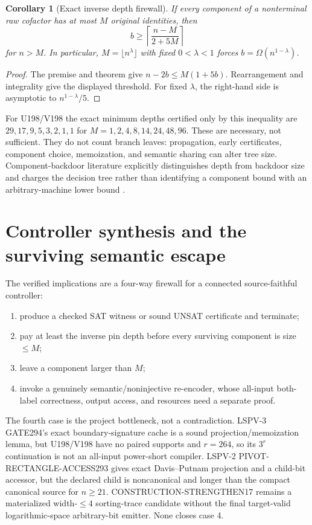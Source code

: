 \documentclass[11pt]{article}
\newtheorem{corollary}{Corollary}
\begin{document}
\begin{corollary}[Exact inverse depth firewall]
If every component of a nonterminal raw cofactor has at most $M$ original identities, then
\[
 b\ge \left\lceil\frac{n-M}{2+5M}\right\rceil
\]
for $n>M$.  In particular, $M=\lfloor n^\lambda\rfloor$ with fixed $0<\lambda<1$ forces $b=\Omega(n^{1-\lambda})$.
\end{corollary}
\begin{proof}
The premise and theorem give $n-2b\le M(1+5b)$.  Rearrangement and integrality give the displayed threshold.  For fixed $\lambda$, the right-hand side is asymptotic to $n^{1-\lambda}/5$.
\end{proof}

For U198/V198 the exact minimum depths certified only by this inequality are $29,17,9,5,3,2,1,1$ for $M=1,2,4,8,14,24,48,96$.  These are necessary, not sufficient.  They do not count branch leaves: propagation, early certificates, component choice, memoization, and semantic sharing can alter tree size.  Component-backdoor literature explicitly distinguishes depth from backdoor size and charges the decision tree rather than identifying a component bound with an arbitrary-machine lower bound \cite{depth,recursive,treewidth}.

\section{Controller synthesis and the surviving semantic escape}
The verified implications are a four-way firewall for a connected source-faithful controller:
\begin{enumerate}
\item produce a checked SAT witness or sound UNSAT certificate and terminate;
\item pay at least the inverse pin depth before every surviving component is size $\le M$;
\item leave a component larger than $M$;
\item invoke a genuinely semantic/noninjective re-encoder, whose all-input both-label correctness, output access, and resources need a separate proof.
\end{enumerate}

The fourth case is the project bottleneck, not a contradiction.  LSPV-3 GATE294's exact boundary-signature cache is a sound projection/memoization lemma, but U198/V198 have no paired supports and $r=264$, so its $3^r$ continuation is not an all-input power-short compiler.  LSPV-2 PIVOT-RECTANGLE-ACCESS293 gives exact Davis--Putnam projection and a child-bit accessor, but the declared child is noncanonical and longer than the compact canonical source for $n\ge21$.  CONSTRUCTION-STRENGTHEN17 remains a materialized width-$\le4$ sorting-trace candidate without the final target-valid logarithmic-space arbitrary-bit emitter.  None closes case 4.
\end{document}
